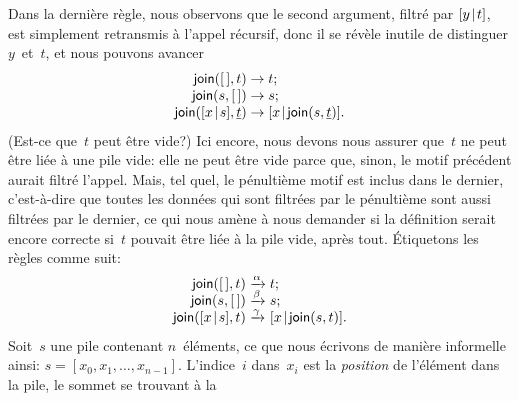 Dans la dernière règle, nous observons que le second argument, filtré
par \([{y}\!\mid\!{t}]\), est simplement retransmis à l'appel récursif,
donc il se révèle inutile de distinguer \(y\)~et~\(t\), et nous
pouvons avancer
\begin{equation*}
\begin{array}{r@{\;}l@{\;}l}
\fun{join}(\el,t) & \rightarrow & t;\\
\fun{join}(s,\el) & \rightarrow & s;\\
\fun{join}(\cons{x}{s},\underline{t}) & \rightarrow &
\cons{x}{\fun{join}(s,\underline{t})}.
\end{array}
\end{equation*}
(Est-ce que~\(t\) peut être vide?) Ici encore, nous devons nous
assurer que~\(t\) ne peut être liée à une pile vide: elle ne peut être
vide parce que, sinon, le motif précédent aurait filtré l'appel. Mais,
tel quel, le pénultième motif est inclus dans le dernier, c'est-à-dire
que toutes les données qui sont filtrées par le pénultième sont aussi
filtrées par le dernier, ce qui nous amène à nous demander si la
définition serait encore correcte si~\(t\) pouvait être liée à la pile
vide, après tout. Étiquetons les règles comme suit:
\begin{equation*}
\begin{array}{r@{\;}l@{\;}l}
\fun{join}(\el,t) & \smashedrightarrow{\alpha} & t;\\
\fun{join}(s,\el) & \smashedrightarrow{\beta} & s;\\
\fun{join}(\cons{x}{s},t) & \smashedrightarrow{\gamma} &
\cons{x}{\fun{join}(s,t)}.
\end{array}
\end{equation*}
Soit~\(s\) une pile contenant \(n\)~éléments, ce que nous écrivons de
manière informelle ainsi: \(s = [x_0, x_1, \dots,
x_{n-1}]\). L'indice~\(i\) dans~\(x_i\) est la \emph{position} de
l'élément dans la pile, le sommet se trouvant à la
